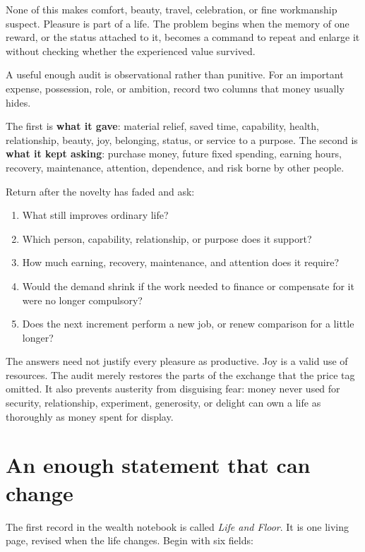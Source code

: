 None of this makes comfort, beauty, travel, celebration, or fine workmanship
suspect. Pleasure is part of a life. The problem begins when the memory of one
reward, or the status attached to it, becomes a command to repeat and enlarge
it without checking whether the experienced value survived.

A useful enough audit is observational rather than punitive. For an important
expense, possession, role, or ambition, record two columns that money usually
hides.

The first is \textbf{what it gave}: material relief, saved time, capability,
health, relationship, beauty, joy, belonging, status, or service to a purpose.
The second is \textbf{what it kept asking}: purchase money, future fixed
spending, earning hours, recovery, maintenance, attention, dependence, and
risk borne by other people.

Return after the novelty has faded and ask:

\begin{enumerate}
\item What still improves ordinary life?
\item Which person, capability, relationship, or purpose does it support?
\item How much earning, recovery, maintenance, and attention does it require?
\item Would the demand shrink if the work needed to finance or compensate for
  it were no longer compulsory?
\item Does the next increment perform a new job, or renew comparison for a
  little longer?
\end{enumerate}

The answers need not justify every pleasure as productive. Joy is a valid use
of resources. The audit merely restores the parts of the exchange that the
price tag omitted. It also prevents austerity from disguising fear: money never
used for security, relationship, experiment, generosity, or delight can own a
life as thoroughly as money spent for display.

\section{An enough statement that can change}

The first record in the wealth notebook is called \emph{Life and Floor}. It is
one living page, revised when the life changes. Begin with six fields:


